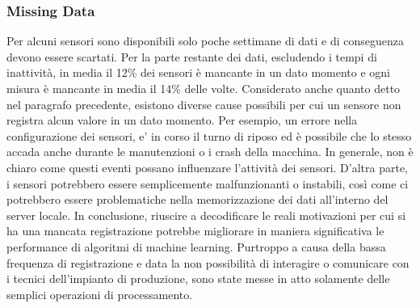 \subsubsection{Missing Data}
Per alcuni sensori sono disponibili solo poche settimane di dati e di conseguenza devono essere scartati. Per la parte restante dei dati, escludendo i tempi di inattività, in media il 12\% dei sensori è mancante in un dato momento e ogni misura è mancante in media il 14\% delle volte. Considerato anche quanto detto nel paragrafo precedente, esistono diverse cause possibili per cui un sensore non registra alcun valore in un dato momento. Per esempio, un errore nella configurazione dei sensori, e' in corso il turno di riposo ed è possibile che lo stesso accada anche durante le manutenzioni o i crash della macchina.
In generale, non è chiaro come questi eventi possano influenzare l'attività dei sensori. D'altra parte, i sensori potrebbero essere semplicemente malfunzionanti o instabili, così come ci potrebbero essere problematiche nella memorizzazione dei dati all'interno del server locale. 
In conclusione, riuscire a decodificare le reali motivazioni per cui si ha una mancata registrazione potrebbe migliorare in maniera significativa le performance di algoritmi di machine learning. Purtroppo a causa della bassa frequenza di registrazione e data la non possibilità di interagire o comunicare con i tecnici dell'impianto di produzione, sono state messe in atto solamente delle semplici operazioni di processamento.


